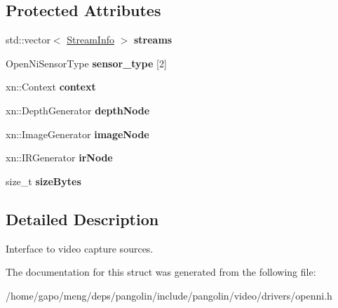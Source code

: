 \subsection*{Protected Attributes}
\begin{DoxyCompactItemize}
\item 
std\+::vector$<$ \hyperlink{classpangolin_1_1_stream_info}{Stream\+Info} $>$ {\bfseries streams}\hypertarget{structpangolin_1_1_open_ni_video_a546a3995e35460ee7fe01baf4cbb6624}{}\label{structpangolin_1_1_open_ni_video_a546a3995e35460ee7fe01baf4cbb6624}

\item 
Open\+Ni\+Sensor\+Type {\bfseries sensor\+\_\+type} \mbox{[}2\mbox{]}\hypertarget{structpangolin_1_1_open_ni_video_aa9c3e7cb9414cfe0b36dd4ea11a49d9a}{}\label{structpangolin_1_1_open_ni_video_aa9c3e7cb9414cfe0b36dd4ea11a49d9a}

\item 
xn\+::\+Context {\bfseries context}\hypertarget{structpangolin_1_1_open_ni_video_a393c80caa5ce7ff1b86de4b36778bdfc}{}\label{structpangolin_1_1_open_ni_video_a393c80caa5ce7ff1b86de4b36778bdfc}

\item 
xn\+::\+Depth\+Generator {\bfseries depth\+Node}\hypertarget{structpangolin_1_1_open_ni_video_a6d746cf4caba53b49dfd8076670faebc}{}\label{structpangolin_1_1_open_ni_video_a6d746cf4caba53b49dfd8076670faebc}

\item 
xn\+::\+Image\+Generator {\bfseries image\+Node}\hypertarget{structpangolin_1_1_open_ni_video_a9bc169dc6e7383c2b232ae3dca2abe6f}{}\label{structpangolin_1_1_open_ni_video_a9bc169dc6e7383c2b232ae3dca2abe6f}

\item 
xn\+::\+I\+R\+Generator {\bfseries ir\+Node}\hypertarget{structpangolin_1_1_open_ni_video_a906f8046e534c6a73545e04fc88bbd98}{}\label{structpangolin_1_1_open_ni_video_a906f8046e534c6a73545e04fc88bbd98}

\item 
size\+\_\+t {\bfseries size\+Bytes}\hypertarget{structpangolin_1_1_open_ni_video_a5a28e0dcf514daf69f4b92e47fff56a8}{}\label{structpangolin_1_1_open_ni_video_a5a28e0dcf514daf69f4b92e47fff56a8}

\end{DoxyCompactItemize}


\subsection{Detailed Description}
Interface to video capture sources. 

The documentation for this struct was generated from the following file\+:\begin{DoxyCompactItemize}
\item 
/home/gapo/meng/deps/pangolin/include/pangolin/video/drivers/openni.\+h\end{DoxyCompactItemize}
